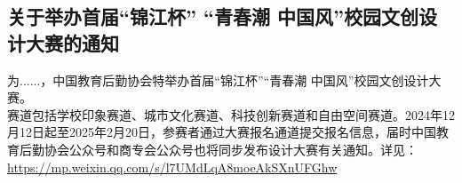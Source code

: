 \documentclass[letterpaper, 12pt]{article}
\begin{document}
\begin{multicols}{2}
\section{关于举办首届“锦江杯” “青春潮 中国风”校园文创设计大赛的通知}
为......，中国教育后勤协会特举办首届“锦江杯”“青春潮 中国风”校园文创设计大赛。\\
赛道包括学校印象赛道、城市文化赛道、科技创新赛道和自由空间赛道。2024年12月12日起至2025年2月20日，参赛者通过大赛报名通道提交报名信息，届时中国教育后勤协会公众号和商专会公众号也将同步发布设计大赛有关通知。详见：\url{https://mp.weixin.qq.com/s/l7UMdLqA8moeAkSXnUFGhw}
\end{multicols} 
\end{document}
